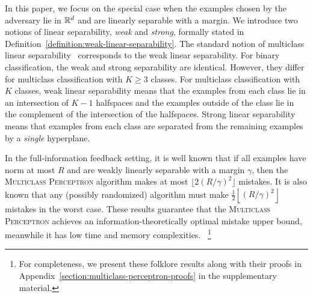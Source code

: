In this paper, we focus on the special case when the examples chosen by the
adversary lie in $\mathbb{R}^d$ and are linearly separable with a margin. We introduce
two notions of linear separability, \emph{weak} and \emph{strong}, formally
stated in
Definition~\ref{definition:weak-linear-separability}.
The standard notion of multiclass linear
separability~\citep{Crammer-Singer-2003} corresponds to the weak linear
separability. For binary classification, the weak and strong separability are
identical. However, they differ for multiclass classification with $K \ge 3$
classes. For multiclass classification with $K$ classes, weak linear
separability means that the examples from each class lie in an intersection of
$K-1$ halfspaces and the examples outside of the class lie in the complement of
the intersection of the halfspaces. Strong linear separability means that
examples from each class are separated from the remaining examples by a
\emph{single} hyperplane.

In the full-information feedback setting, it is well known
\citep{Crammer-Singer-2003} that if all examples have norm at most $R$ and are
weakly linearly separable with a margin $\gamma$, then the \textsc{Multiclass
Perceptron} algorithm makes at most $\lfloor 2(R/\gamma)^2 \rfloor$ mistakes.
It is also known that any (possibly randomized) algorithm must
make $\frac{1}{2} \left\lfloor (R/\gamma)^2 \right \rfloor$ mistakes in the
worst case.
These results guarantee that the \textsc{Multiclass Perceptron} achieves an
information-theoretically optimal mistake upper bound, meanwhile it has
low time and memory complexities.%
~\footnote{
For completeness, we present these 
folklore
results along
with their proofs in Appendix~\ref{section:multiclass-perceptron-proofs} in the
supplementary material.}

